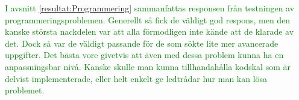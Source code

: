 \textcolor{green}{I avsnitt \ref{resultat:Programmering} sammanfattas responsen från testningen av programmeringsproblemen. Generellt så fick de väldigt god respons, men den kanske största nackdelen var att alla förmodligen inte kände att de klarade av det. Dock så var de väldigt passande för de som sökte lite mer avancerade uppgifter. Det bästa vore givetvis att även med dessa problem kunna ha en anpassningsbar nivå. Kanske skulle man kunna tillhandahålla kodskal som är delvist implementerade, eller helt enkelt ge ledtrådar hur man kan lösa problemet.}